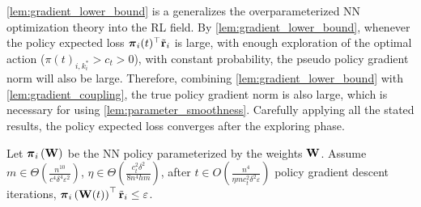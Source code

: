 \cref{lem:gradient_lower_bound} is a generalizes the overparameterized NN optimization theory into the RL field. By \cref{lem:gradient_lower_bound}, whenever the policy expected loss ${\boldsymbol{\pi}}_{i}(t)^\top {\tilde{\mathbf{r}}}_{i}$ is large, with enough exploration of the optimal action ($\pi(t)_{i, k_i^*} > c_t > 0$), with constant probability, the pseudo policy gradient norm will also be large. Therefore, combining \cref{lem:gradient_lower_bound} with \cref{lem:gradient_coupling}, the true policy gradient norm is also large, which is necessary for using \cref{lem:parameter_smoothness}. Carefully applying all the stated results, the policy expected loss converges after the exploring phase.

\begin{thm}
\label{thm:regret_convergence}
    Let ${\boldsymbol{\pi}}_i\left( {\mathbf{W}} \right)$ be the NN policy parameterized by the weights ${\mathbf{W}}$. Assume $m \in \Theta\left( \frac{n^{10}}{c^4 \delta^4 \varepsilon^2} \right)$, $\eta \in \Theta\left( \frac{c_t^2 \delta^2}{8 n^4 h m} \right)$, after $t \in O\left( \frac{n^4}{\eta m c_t^2 \delta^2 \varepsilon} \right)$ policy gradient descent iterations, ${\boldsymbol{\pi}}_i\left( {\mathbf{W}}(t) \right)^\top {\tilde{\mathbf{r}}}_i \le \varepsilon$.
\end{thm}
